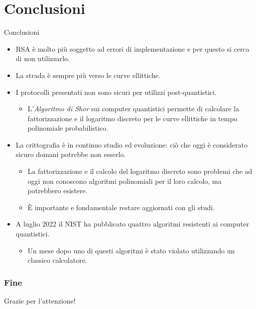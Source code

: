 \documentclass[11pt,svgnames,smaller,aspectratio=169,italian]{beamer}
\begin{document}
\section{Conclusioni}
\begin{frame}
	\sectionpage
	\centering
\end{frame}

\begin{frame}{Conclusioni}
	\begin{itemize}
		\item RSA è molto più soggetto ad errori di implementazione e per questo si cerca di non utilizzarlo.
		\item La strada è sempre più verso le curve ellittiche.
		\item I protocolli presentati non sono sicuri per utilizzi post-quantistici.
			\begin{itemize}
				\item L'\emph{Algoritmo di Shor} sui computer quantistici permette di calcolare la fattorizzazione e il logaritmo discreto per le curve ellittiche in tempo polinomiale probabilistico.
			\end{itemize}
		\item La crittografia è in continuo studio ed evoluzione: ciò che oggi è considerato sicuro domani potrebbe non esserlo.
			\begin{itemize}
				\item La fattorizzazione e il calcolo del logaritmo discreto sono problemi che ad oggi non conoscono algoritmi polinomiali per il loro calcolo, ma potrebbero esistere.
				\item È importante e fondamentale restare aggiornati con gli studi.
			\end{itemize}
		\item A luglio 2022 il NIST ha pubblicato quattro algoritmi resistenti ai computer quantistici.
			\begin{itemize}
				\item Un mese dopo uno di questi algoritmi è stato violato utilizzando un classico calcolatore.
			\end{itemize}
	\end{itemize}
\end{frame}

\begin{frame}
		\frametitle{Fine}
		\centering
		\Large
		Grazie per l'attenzione!
\end{frame}
\end{document}
